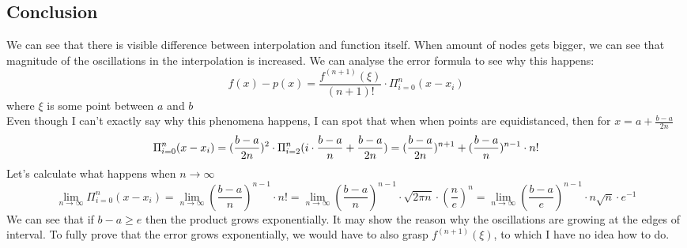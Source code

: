 \documentclass[11pt]{article}
\begin{document}
\subsection*{Conclusion}
We can see that there is visible difference between interpolation and function itself.
When amount of nodes gets bigger, we can see that magnitude of the oscillations in the interpolation is increased.
We can analyse the error formula to see why this happens:
\begin{equation*}
    f(x) - p(x) = \frac{f^{(n+1)}(\xi)}{(n+1)!} \cdot \Pi^n_{i=0}(x-x_i)
\end{equation*}
where $\xi$ is some point between $a$ and $b$\\
Even though I can't exactly say why this phenomena happens, 
I can spot that when when points are equidistanced, then for $x = a + \frac{b-a}{2n}$
\begin{equation*}
    \Pi^n_{i=0}{(x-x_i)} = (\frac{b-a}{2n})^2 \cdot \Pi ^n _{i=2}(i\cdot\frac{b-a}{n} + \frac{b-a}{2n}) 
    = (\frac{b-a}{2n})^{n+1} + (\frac{b-a}{n})^{n-1} \cdot n! \\
\end{equation*}
Let's calculate what happens when $ n \to \infty $  
\begin{equation*}
    \lim_{n \to \infty} \Pi^n_{i=0}{(x-x_i)} = \lim_{n \to \infty} (\frac{b-a}{n})^{n-1} \cdot n! = \lim_{n \to \infty}  (\frac{b-a}{n})^{n-1} \cdot \sqrt{2\pi n} \cdot (\frac{n}{e})^n = \lim_{n \to \infty} (\frac{b-a}{e})^{n-1} \cdot n\sqrt{n} \cdot e^{-1}
\end{equation*}
We can see that if $b-a \geq e $ then the product grows exponentially. It may show the reason why the oscillations are growing at the edges of interval.
To fully prove that the error grows exponentially, we would have to also grasp $f^{(n+1)}(\xi)$, to which I have no idea how to do.
\end{document}
